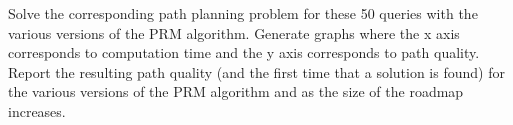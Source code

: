 \question{[10]}

Solve the corresponding path planning problem for these 50 queries with the
various versions of the PRM algorithm. Generate graphs where the x axis
corresponds to computation time and the y axis corresponds to path quality.
Report the resulting path quality (and the first time that a solution is found)
for the various versions of the PRM algorithm and as the size of the roadmap
increases.